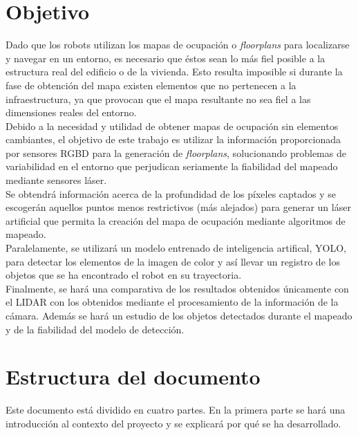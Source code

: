 \section{Objetivo}

Dado que los robots utilizan los mapas de ocupación o \textit{floorplans} para localizarse y navegar en un entorno, es necesario que éstos sean lo más fiel posible a la estructura real del edificio o de la vivienda. Esto resulta imposible si durante la fase de obtención del mapa existen elementos que no pertenecen a la infraestructura, ya que provocan que el mapa resultante no sea fiel a las dimensiones reales del entorno.\\

Debido a la necesidad y utilidad de obtener mapas de ocupación sin elementos cambiantes, el objetivo de este trabajo es utilizar la información proporcionada por sensores RGBD para la generación de \textit{floorplans}, solucionando problemas de variabilidad en el entorno que perjudican seriamente la fiabilidad del mapeado mediante sensores láser.\\

Se obtendrá información acerca de la profundidad de los píxeles captados y se escogerán aquellos puntos menos restrictivos (más alejados) para generar un láser artificial que permita la creación del mapa de ocupación mediante algoritmos de mapeado.\\

Paralelamente, se utilizará un modelo entrenado de inteligencia artifical, YOLO, para detectar los elementos de la imagen de color y así llevar un registro de los objetos que se ha encontrado el robot en su trayectoria.\\

Finalmente, se hará una comparativa de los resultados obtenidos únicamente con el LIDAR con los obtenidos mediante el procesamiento de la información de la cámara. Además se hará un estudio de los objetos detectados durante el mapeado y de la fiabilidad del modelo de detección. \\

\section{Estructura del documento}

Este documento está dividido en cuatro partes. En la primera parte se hará una introducción al contexto del proyecto y se explicará por qué se ha desarrollado.\\


